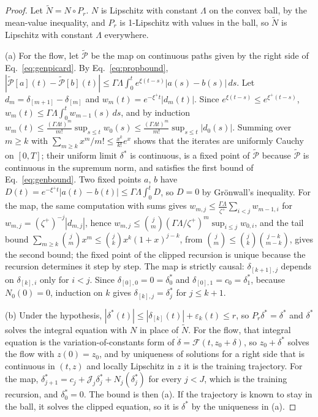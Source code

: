 \documentclass[11pt]{article}
\theoremstyle{definition}
\theoremstyle{remark}
\begin{document}
\begin{proof}
Let $\tilde N = N\circ P_r$.
$N$ is Lipschitz with constant $\Lambda$ on the convex ball, by the mean-value inequality, and $P_r$ is 1-Lipschitz with values in the ball, so $\tilde N$ is Lipschitz with constant $\Lambda$ everywhere.

(a) For the flow, let $\tilde{\mathcal P}$ be the map on continuous paths given by the right side of Eq.~\eqref{eq:genpicard}.
By Eq.~\eqref{eq:propbound}, $|\tilde{\mathcal P}[a](t) - \tilde{\mathcal P}[b](t)|\le\Gamma\Lambda\int_0^te^{\xi(t-s)}|a(s) - b(s)|\,ds$.
Let $d_m = \delta_{[m+1]} - \delta_{[m]}$ and $w_m(t) = e^{-\xi^+t}|d_m(t)|$.
Since $e^{\xi(t-s)}\le e^{\xi^+(t-s)}$, $w_m(t)\le\Gamma\Lambda\int_0^tw_{m-1}(s)\,ds$, and by induction $w_m(t)\le\frac{(\Gamma\Lambda t)^m}{m!}\sup_{s\le t}w_0(s)\le\frac{(\Gamma\Lambda t)^m}{m!}\sup_{s\le t}|d_0(s)|$.
Summing over $m\ge k$ with $\sum_{m\ge k}x^m/m!\le\frac{x^k}{k!}e^x$ shows that the iterates are uniformly Cauchy on $[0,T]$; their uniform limit $\delta^\ast$ is continuous, is a fixed point of $\tilde{\mathcal P}$ because $\tilde{\mathcal P}$ is continuous in the supremum norm, and satisfies the first bound of Eq.~\eqref{eq:genbound}.
Two fixed points $a$, $b$ have $D(t) = e^{-\xi^+t}|a(t) - b(t)|\le\Gamma\Lambda\int_0^tD$, so $D = 0$ by Gr\"onwall's inequality.
For the map, the same computation with sums gives $w_{m,j}\le\frac{\Gamma\Lambda}{\zeta^+}\sum_{i<j}w_{m-1,i}$ for $w_{m,j} = (\zeta^+)^{-j}|d_{m,j}|$, hence $w_{m,j}\le\binom jm(\Gamma\Lambda/\zeta^+)^m\sup_{i\le j}w_{0,i}$, and the tail bound $\sum_{m\ge k}\binom jmx^m\le\binom jkx^k(1+x)^{j-k}$, from $\binom jm\le\binom jk\binom{j-k}{m-k}$, gives the second bound; the fixed point of the clipped recursion is unique because the recursion determines it step by step.
The map is strictly causal: $\delta_{[k+1],j}$ depends on $\delta_{[k],i}$ only for $i < j$.
Since $\delta_{[0],0} = 0 = \delta^\ast_0$ and $\delta_{[0],1} = c_0 = \delta^\ast_1$, because $N_0(0) = 0$, induction on $k$ gives $\delta_{[k],j} = \delta^\ast_j$ for $j\le k + 1$.

(b) Under the hypothesis, $|\delta^\ast(t)|\le|\delta_{[k]}(t)| + \varepsilon_k(t)\le r$, so $P_r\delta^\ast = \delta^\ast$ and $\delta^\ast$ solves the integral equation with $N$ in place of $\tilde N$.
For the flow, that integral equation is the variation-of-constants form of $\dot\delta = \mathcal{F}(t, z_0 + \delta)$, so $z_0 + \delta^\ast$ solves the flow with $z(0) = z_0$, and by uniqueness of solutions for a right side that is continuous in $(t, z)$ and locally Lipschitz in $z$ it is the training trajectory.
For the map, $\delta^\ast_{j+1} = c_j + \mathcal{J}_j\delta^\ast_j + N_j(\delta^\ast_j)$ for every $j < J$, which is the training recursion, and $\delta^\ast_0 = 0$.
The bound is then (a).
If the trajectory is known to stay in the ball, it solves the clipped equation, so it is $\delta^\ast$ by the uniqueness in (a).


\end{proof}
\end{document}
